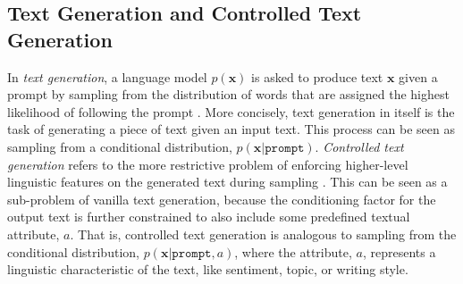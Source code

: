 \subsection{Text Generation and Controlled Text Generation}
\label{subsec:text_gen_and_ctg}


In \textit{text generation}, a language model $p(\textbf{x})$ is asked to produce text $\textbf{x}$ given a prompt by sampling from the distribution of words that are assigned the highest likelihood of following the prompt \citep{radford2019language}. More concisely, text generation in itself is the task of generating a piece of text given an input text. This process can be seen as sampling from a conditional distribution, $p(\textbf{x} | \texttt{prompt})$. \textit{Controlled text generation} refers to the more restrictive problem of enforcing higher-level linguistic features on the generated text during sampling \citep{dathathri2019plug, prabhumoye-etal-2020-exploring}. This can be seen as a sub-problem of vanilla text generation, because the conditioning factor for the output text is further constrained to also include some predefined textual attribute, $a$. That is, controlled text generation is analogous to sampling from the conditional distribution, $p(\textbf{x} | \texttt{prompt}, a)$, where the attribute, $a$, represents a linguistic characteristic of the text, like sentiment, topic, or writing style. 


